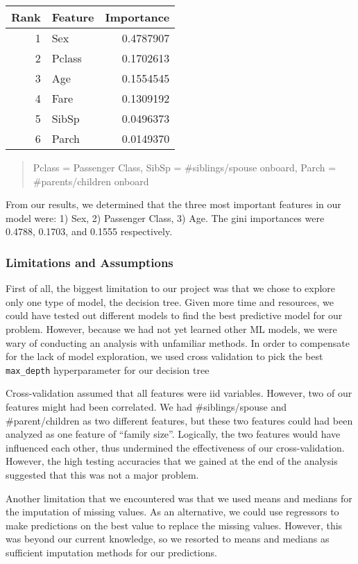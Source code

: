\documentclass[]{article}
\begin{document}
\begin{longtable}[]{@{}rlr@{}}
\toprule
Rank & Feature & Importance\tabularnewline
\midrule
\endhead
1 & Sex & 0.4787907\tabularnewline
2 & Pclass & 0.1702613\tabularnewline
3 & Age & 0.1554545\tabularnewline
4 & Fare & 0.1309192\tabularnewline
5 & SibSp & 0.0496373\tabularnewline
6 & Parch & 0.0149370\tabularnewline
\bottomrule
\end{longtable}

\begin{quote}
Pclass = Passenger Class, SibSp = \#siblings/spouse onboard, Parch =
\#parents/children onboard
\end{quote}

From our results, we determined that the three most important features
in our model were: 1) Sex, 2) Passenger Class, 3) Age. The gini
importances were 0.4788, 0.1703, and 0.1555 respectively.

\subsubsection{Limitations and
Assumptions}\label{limitations-and-assumptions}

First of all, the biggest limitation to our project was that we chose to
explore only one type of model, the decision tree. Given more time and
resources, we could have tested out different models to find the best
predictive model for our problem. However, because we had not yet
learned other ML models, we were wary of conducting an analysis with
unfamiliar methods. In order to compensate for the lack of model
exploration, we used cross validation to pick the best
\texttt{max\_depth} hyperparameter for our decision tree

Cross-validation assumed that all features were iid variables. However,
two of our features might had been correlated. We had \#siblings/spouse
and \#parent/children as two different features, but these two features
could had been analyzed as one feature of ``family size''. Logically,
the two features would have influenced each other, thus undermined the
effectiveness of our cross-validation. However, the high testing
accuracies that we gained at the end of the analysis suggested that this
was not a major problem.

Another limitation that we encountered was that we used means and
medians for the imputation of missing values. As an alternative, we
could use regressors to make predictions on the best value to replace
the missing values. However, this was beyond our current knowledge, so
we resorted to means and medians as sufficient imputation methods for
our predictions.
\end{document}
